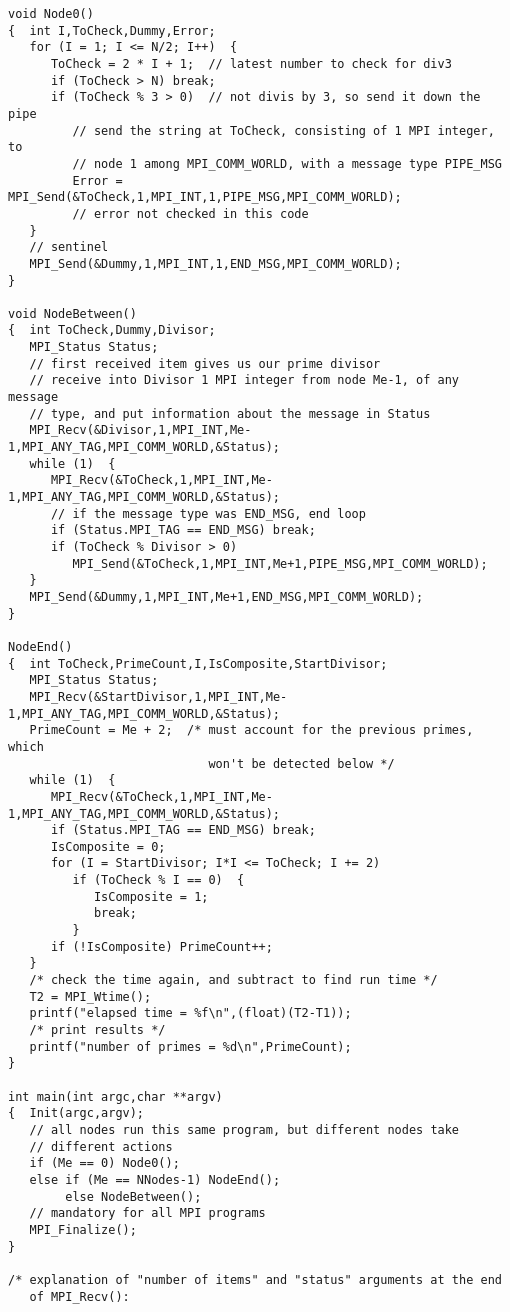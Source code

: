 \begin{Verbatim}
void Node0()
{  int I,ToCheck,Dummy,Error;
   for (I = 1; I <= N/2; I++)  {
      ToCheck = 2 * I + 1;  // latest number to check for div3
      if (ToCheck > N) break;
      if (ToCheck % 3 > 0)  // not divis by 3, so send it down the pipe
         // send the string at ToCheck, consisting of 1 MPI integer, to
         // node 1 among MPI_COMM_WORLD, with a message type PIPE_MSG
         Error = MPI_Send(&ToCheck,1,MPI_INT,1,PIPE_MSG,MPI_COMM_WORLD);
         // error not checked in this code
   }
   // sentinel
   MPI_Send(&Dummy,1,MPI_INT,1,END_MSG,MPI_COMM_WORLD);
}

void NodeBetween()
{  int ToCheck,Dummy,Divisor;
   MPI_Status Status;
   // first received item gives us our prime divisor
   // receive into Divisor 1 MPI integer from node Me-1, of any message
   // type, and put information about the message in Status
   MPI_Recv(&Divisor,1,MPI_INT,Me-1,MPI_ANY_TAG,MPI_COMM_WORLD,&Status);
   while (1)  {
      MPI_Recv(&ToCheck,1,MPI_INT,Me-1,MPI_ANY_TAG,MPI_COMM_WORLD,&Status);
      // if the message type was END_MSG, end loop
      if (Status.MPI_TAG == END_MSG) break;
      if (ToCheck % Divisor > 0)
         MPI_Send(&ToCheck,1,MPI_INT,Me+1,PIPE_MSG,MPI_COMM_WORLD);
   }
   MPI_Send(&Dummy,1,MPI_INT,Me+1,END_MSG,MPI_COMM_WORLD);
}

NodeEnd()
{  int ToCheck,PrimeCount,I,IsComposite,StartDivisor;
   MPI_Status Status;
   MPI_Recv(&StartDivisor,1,MPI_INT,Me-1,MPI_ANY_TAG,MPI_COMM_WORLD,&Status);
   PrimeCount = Me + 2;  /* must account for the previous primes, which
                            won't be detected below */
   while (1)  {
      MPI_Recv(&ToCheck,1,MPI_INT,Me-1,MPI_ANY_TAG,MPI_COMM_WORLD,&Status);
      if (Status.MPI_TAG == END_MSG) break;
      IsComposite = 0;
      for (I = StartDivisor; I*I <= ToCheck; I += 2)
         if (ToCheck % I == 0)  {
            IsComposite = 1;
            break;
         }
      if (!IsComposite) PrimeCount++;
   }
   /* check the time again, and subtract to find run time */
   T2 = MPI_Wtime();
   printf("elapsed time = %f\n",(float)(T2-T1));
   /* print results */
   printf("number of primes = %d\n",PrimeCount);
}

int main(int argc,char **argv)
{  Init(argc,argv);
   // all nodes run this same program, but different nodes take
   // different actions
   if (Me == 0) Node0();
   else if (Me == NNodes-1) NodeEnd();
        else NodeBetween();
   // mandatory for all MPI programs
   MPI_Finalize();
}

/* explanation of "number of items" and "status" arguments at the end
   of MPI_Recv():


\end{Verbatim}
